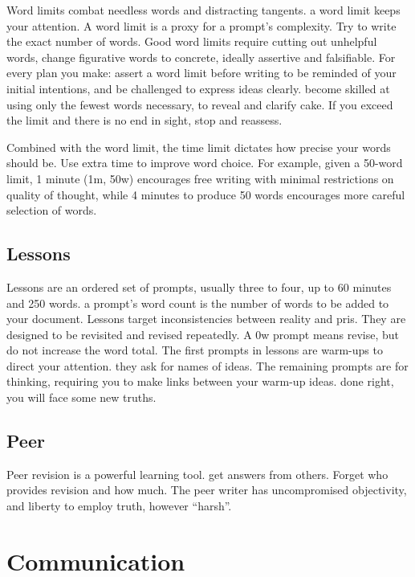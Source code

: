 \documentclass[
]{book}
\begin{document}
Word limits combat needless words and distracting tangents. a word limit keeps your attention.
A word limit is a proxy for a prompt's complexity.
Try to write the exact number of words.
Good word limits require cutting out unhelpful words, change figurative words to concrete, ideally assertive and falsifiable.
For every plan you make: assert a word limit before writing to be reminded of your initial intentions, and be challenged to express ideas clearly. become skilled at using only the fewest words necessary, to reveal and clarify cake.
If you exceed the limit and there is no end in sight, stop and reassess.

Combined with the word limit, the time limit dictates how precise your words should be.
Use extra time to improve word choice.
For example, given a 50-word limit, 1 minute (1m, 50w) encourages free writing with minimal restrictions on quality of thought, while 4 minutes to produce 50 words encourages more careful selection of words.

\section{Lessons}\label{lessons}

Lessons are an ordered set of prompts, usually three to four, up to 60 minutes and 250 words. a prompt's word count is the number of words to be added to your document.
Lessons target inconsistencies between reality and pris.
They are designed to be revisited and revised repeatedly.
A 0w prompt means revise, but do not increase the word total.
The first prompts in lessons are warm-ups to direct your attention. they ask for names of ideas.
The remaining prompts are for thinking, requiring you to make links between your warm-up ideas. done right, you will face some new truths.

\section{Peer}\label{peer}

Peer revision is a powerful learning tool. get answers from others.
Forget who provides revision and how much.
The peer writer has uncompromised objectivity, and liberty to employ truth, however ``harsh''.

\chapter{Communication}\label{communication}
\end{document}
